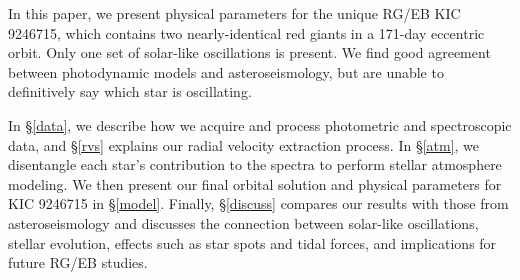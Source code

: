 In this paper, we present physical parameters for the unique RG/EB KIC 9246715, which contains two nearly-identical red giants in a 171-day eccentric orbit. Only one set of solar-like oscillations is present. We find good agreement between photodynamic models and asteroseismology, but are unable to definitively say which star is oscillating. %

In \S \ref{data}, we describe how we acquire and process photometric and spectroscopic data, and \S \ref{rvs} explains our radial velocity extraction process. In \S \ref{atm}, we disentangle each star's contribution to the spectra to perform stellar atmosphere modeling. We then present our final orbital solution and physical parameters for KIC 9246715 in \S \ref{model}. Finally, \S \ref{discuss} compares our results with those from asteroseismology and discusses the connection between solar-like oscillations, stellar evolution, effects such as star spots and tidal forces, and implications for future RG/EB studies.

  
  
  
  
  